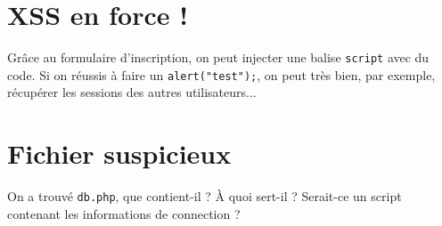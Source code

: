 \documentclass[oneside,10pt]{article}
\begin{document}
\section{XSS en force !}
Gr\^ace au formulaire d'inscription, on peut injecter une balise \verb+script+ avec du code.
Si on r\'eussis \`a faire un \verb+alert("test");+, on peut tr\`es bien, par exemple, r\'ecup\'erer les sessions des autres utilisateurs...

\section{Fichier suspicieux}
On a trouv\'e \verb+db.php+, que contient-il ?
\`A quoi sert-il ?
Serait-ce un script contenant les informations de connection ?
\end{document}
